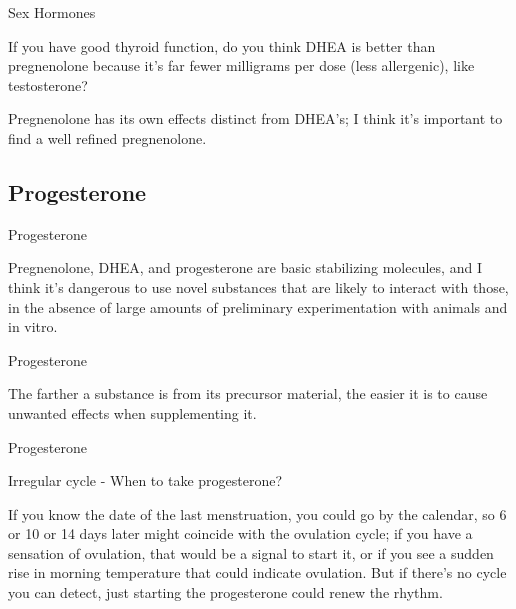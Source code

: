 \documentclass[11pt,oneside,openany,extrafontsizes]{memoir}
\begin{document}
\begin{qaexchange}{Sex Hormones}

    \begin{question}
        If you have good thyroid function, do you think DHEA is better than pregnenolone because it's far fewer milligrams per dose (less allergenic), like testosterone?
    \end{question}

    \begin{answer}
      Pregnenolone has its own effects distinct from DHEA's; I think it's important to find a well refined pregnenolone.
    \end{answer}
\end{qaexchange}

\subsection{Progesterone}

\begin{standalonequote}{Progesterone}

    \begin{answer}
        Pregnenolone, DHEA, and progesterone are basic stabilizing molecules, and I think it's dangerous to use novel substances that are likely to interact with those, in the absence of large amounts of preliminary experimentation with animals and in vitro. 
    \end{answer}
\end{standalonequote}

\begin{standalonequote}{Progesterone}

    \begin{answer}
        The farther a substance is from its precursor material, the easier it is to cause unwanted effects when supplementing it. 
    \end{answer}
\end{standalonequote}

\begin{qaexchange}{Progesterone}

    \begin{question}
        Irregular cycle - When to take progesterone?
    \end{question}

    \begin{answer}
        If you know the date of the last menstruation, you could go by the calendar, so 6 or 10 or 14 days later might coincide with the ovulation cycle; if you have a sensation of ovulation, that would be a signal to start it, or if you see a sudden rise in morning temperature that could indicate ovulation. But if there's no cycle you can detect, just starting the progesterone could renew the rhythm.
    \end{answer}
\end{qaexchange}
\end{document}
